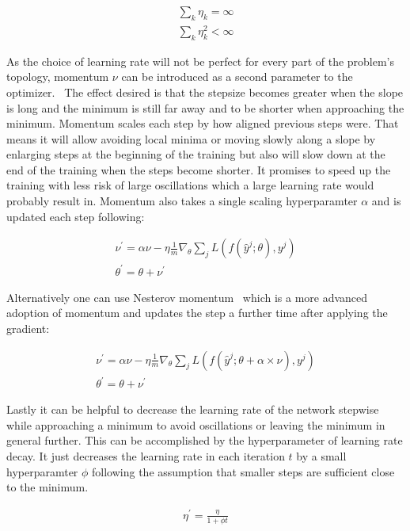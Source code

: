 \begin{align}
    \sum_k \eta_k = \infty\\
    \sum_k \eta_k^2 < \infty
\end{align}

As the choice of learning rate will not be perfect for every part of the problem's topology, momentum $\nu$ can be introduced as a second parameter to the optimizer.~\cite{chollet2015keras} The effect desired is that the stepsize becomes greater when the slope is long and the minimum is still far away and to be shorter when approaching the minimum. Momentum scales each step by how aligned previous steps were. That means it will allow avoiding local minima or moving slowly along a slope by enlarging steps at the beginning of the training but also will slow down at the end of the training when the steps become shorter. It promises to speed up the training with less risk of large oscillations which a large learning rate would probably result in. Momentum also takes a single scaling hyperparamter $\alpha$ and is updated each step following: 

\begin{align}
    \nu^{\prime} = \alpha \nu - \eta \frac{1}{m} \nabla_{\theta} \sum_j L(f(\hat{y}^j; \theta), y^j)\\
    \theta^{\prime} = \theta + \nu^{\prime}
\end{align}

Alternatively one can use Nesterov momentum~\cite{chollet2015keras} which is a more advanced adoption of momentum and updates the step a further time after applying the gradient: 

\begin{align}
    \nu^{\prime} = \alpha \nu - \eta \frac{1}{m} \nabla_{\theta} \sum_j L(f(\hat{y}^j; \theta + \alpha \times \nu), y^j)\\
    \theta^{\prime} = \theta + \nu^{\prime}
\end{align}

Lastly it can be helpful to decrease the learning rate of the network stepwise while approaching a minimum to avoid oscillations or leaving the minimum in general further. This can be accomplished by the hyperparameter of learning rate decay. It just decreases the learning rate in each iteration $t$ by a small hyperparamter $\phi$ following the assumption that smaller steps are sufficient close to the minimum.~\cite{chollet2015keras}

\begin{align}
    \eta^{\prime} = \frac{\eta}{1 + \phi t}
\end{align}

